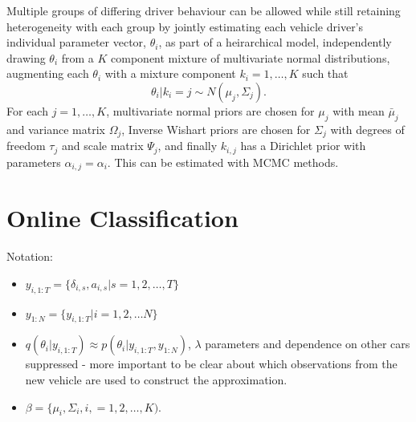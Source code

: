\documentclass[12pt,a4paper]{article}\usepackage[]{graphicx}\usepackage[]{color}
\begin{document}
Multiple groups of differing driver behaviour can be allowed while still retaining heterogeneity with each group by jointly estimating each vehicle driver's individual parameter vector, $\theta_i$, as part of a heirarchical model, independently drawing $\theta_i$ from a $K$ component mixture of multivariate normal distributions, augmenting each $\theta_i$ with a mixture component $k_i = 1, \dots, K$ such that 
\begin{equation}
\theta_i | k_i = j \sim N(\mu_j, \Sigma_j).
\end{equation}
For each $j = 1, \dots, K$, multivariate normal priors are chosen for $\mu_j$ with mean $\bar{\mu}_j$ and variance matrix $\Omega_j$, Inverse Wishart priors are chosen for $\Sigma_j$ with degrees of freedom $\tau_j$ and scale matrix $\Psi_j$, and finally $k_{i, j}$ has a Dirichlet prior with parameters $\alpha_{i, j} = \alpha_i$. This can be estimated with MCMC methods.

\section{Online Classification}

Notation:
\begin{itemize}
\item $y_{i, 1:T} = \{\delta_{i, s}, a_{i, s} | s = 1, 2, \dots, T\}$ 
\item $y_{1:N} = \{y_{i, 1:T} | i = 1, 2, \dots N\}$
\item $q(\theta_i | y_{i, 1:T}) \approx p(\theta_i | y_{i, 1:T}, y_{1:N})$, $\lambda$ parameters and dependence on other cars suppressed - more important to be clear about which observations from the new vehicle are used to construct the approximation.
\item $\beta = \{\mu_i, \Sigma_i, i, = 1, 2, \dots, K)$.
\end{itemize}
\end{document}
